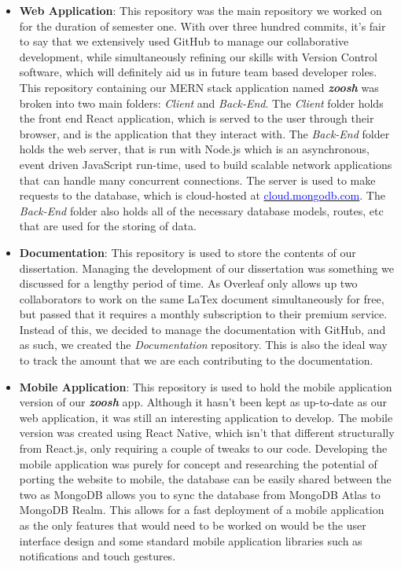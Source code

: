 \begin{itemize}
    \item \textbf{Web Application}: This repository was the main repository we worked on for the duration of semester one. With over three hundred commits, it's fair to say that we extensively used GitHub to manage our collaborative development, while simultaneously refining our skills with Version Control software, which will definitely aid us in future team based developer roles. This repository containing our MERN stack application named \textit{\textbf{zoosh}} was broken into two main folders: \textit{Client} and \textit{Back-End}. The \textit{Client} folder holds the front end React application, which is served to the user through their browser, and is the application that they interact with. The \textit{Back-End} folder holds the web server, that is run with Node.js which is an asynchronous, event driven JavaScript run-time, used to build scalable network applications that can handle many concurrent connections. The server is used to make requests to the database, which is cloud-hosted at \href{https://cloud.mongodb.com/v2/5e930ffe4cdf590dd97ad867#clusters}{\textcolor{blue}{cloud.mongodb.com}}. The \textit{Back-End} folder also holds all of the necessary database models, routes, etc that are used for the storing of data.
    \item \textbf{Documentation}: This repository is used to store the contents of our dissertation. Managing the development of our dissertation was something we discussed for a lengthy period of time. As Overleaf only allows up two collaborators to work on the same LaTex document simultaneously for free, but passed that it requires a monthly subscription to their premium service. Instead of this, we decided to manage the documentation with GitHub, and as such, we created the \textit{Documentation} repository. This is also the ideal way to track the amount that we are each contributing to the documentation.
    \item \textbf{Mobile Application}: This repository is used to hold the mobile application version of our \textit{\textbf{zoosh}} app. Although it hasn't been kept as up-to-date as our web application, it was still an interesting application to develop. The mobile version was created using React Native, which isn't that different structurally from React.js, only requiring a couple of tweaks to our code. Developing the mobile application was purely for concept and researching the potential of porting the website to mobile, the database can be easily shared between the two as MongoDB allows you to sync the database from MongoDB Atlas to MongoDB Realm. This allows for a fast deployment of a mobile application as the only features that would need to be worked on would be the user interface design and some standard mobile application libraries such as notifications and touch gestures.
\end{itemize}


